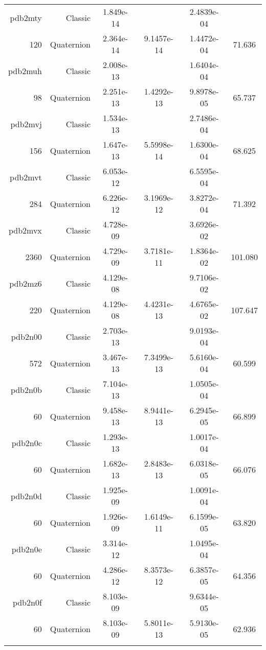\begin{xltabular}{\textwidth}{r|rS[table-format=1.3e+2]S[table-format=1.4e+2]S[table-format=1.4e+2]S[table-format=-1.3]}
pdb2mty & Classic & 1.849e-14 &  & 2.4839e-04 & \\
120 & Quaternion & 2.364e-14 & 9.1457e-14 & 1.4472e-04 & 71.636\\  \addlinespace
pdb2muh & Classic & 2.008e-13 &  & 1.6404e-04 & \\
98 & Quaternion & 2.251e-13 & 1.4292e-13 & 9.8978e-05 & 65.737\\  \addlinespace
pdb2mvj & Classic & 1.534e-13 &  & 2.7486e-04 & \\
156 & Quaternion & 1.647e-13 & 5.5998e-14 & 1.6300e-04 & 68.625\\  \addlinespace
pdb2mvt & Classic & 6.053e-12 &  & 6.5595e-04 & \\
284 & Quaternion & 6.226e-12 & 3.1969e-12 & 3.8272e-04 & 71.392\\  \addlinespace
pdb2mvx & Classic & 4.728e-09 &  & 3.6926e-02 & \\
2360 & Quaternion & 4.729e-09 & 3.7181e-11 & 1.8364e-02 & 101.080\\  \addlinespace
pdb2mz6 & Classic & 4.129e-08 &  & 9.7106e-02 & \\
220 & Quaternion & 4.129e-08 & 4.4231e-13 & 4.6765e-02 & 107.647\\  \addlinespace
pdb2n00 & Classic & 2.703e-13 &  & 9.0193e-04 & \\
572 & Quaternion & 3.467e-13 & 7.3499e-13 & 5.6160e-04 & 60.599\\  \addlinespace
pdb2n0b & Classic & 7.104e-13 &  & 1.0505e-04 & \\
60 & Quaternion & 9.458e-13 & 8.9441e-13 & 6.2945e-05 & 66.899\\  \addlinespace
pdb2n0c & Classic & 1.293e-13 &  & 1.0017e-04 & \\
60 & Quaternion & 1.682e-13 & 2.8483e-13 & 6.0318e-05 & 66.076\\  \addlinespace
pdb2n0d & Classic & 1.925e-09 &  & 1.0091e-04 & \\
60 & Quaternion & 1.926e-09 & 1.6149e-11 & 6.1599e-05 & 63.820\\  \addlinespace
pdb2n0e & Classic & 3.314e-12 &  & 1.0495e-04 & \\
60 & Quaternion & 4.286e-12 & 8.3573e-12 & 6.3857e-05 & 64.356\\  \addlinespace
pdb2n0f & Classic & 8.103e-09 &  & 9.6344e-05 & \\
60 & Quaternion & 8.103e-09 & 5.8011e-13 & 5.9130e-05 & 62.936\\  \addlinespace

\end{xltabular}
